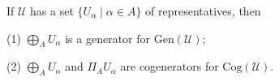 If $\mathcal{U}$ has a set $\{U_\alpha \mid \alpha \in A\}$ of representatives, then

(1) $\bigoplus_A U_\alpha$ is a generator for $\mathrm{Gen}(\mathcal{U})$;

(2) $\bigoplus_A U_\alpha$ and $\Pi_A U_\alpha$ are cogenerators for $\mathrm{Cog}(\mathcal{U})$.
